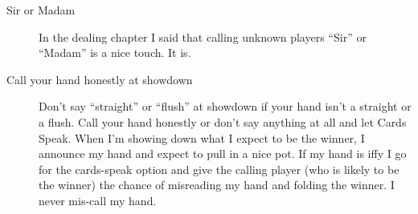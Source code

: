 \begin{description}
\item[Sir or Madam] In the dealing chapter I said that calling
unknown players ``Sir'' or ``Madam'' is a nice touch. It is.

\item[Call your hand honestly at showdown] Don't say ``straight''
or ``flush'' at showdown if your hand isn't a straight or a flush.
Call your hand honestly or don't say anything at all and let
Cards Speak. When I'm showing down what I expect to be the winner,
I announce my hand and expect to pull in a nice pot. If my hand is
iffy I go for the cards-speak option and give the calling player (who
is likely to be the winner) the chance of misreading my hand and
folding the winner. I never mis-call my hand.

\end{description}
